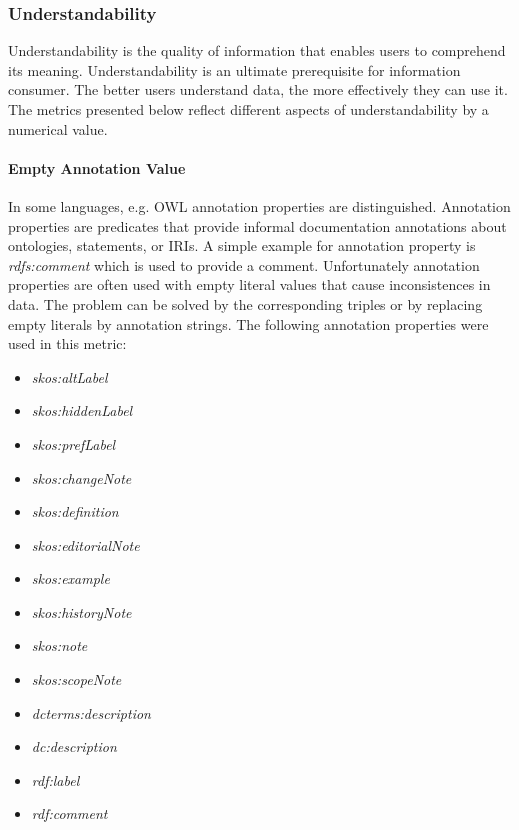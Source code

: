 
\subsubsection{Understandability}

Understandability is the quality of information that enables users to comprehend its meaning. 
Understandability is an ultimate prerequisite for information consumer. 
The better users understand data, the more effectively they can use it. 
The metrics presented below reflect different aspects of understandability by a numerical value.

\paragraph{Empty Annotation Value}
\label{par:emptyAnnotation}
In some languages, e.g. OWL annotation properties are distinguished.
Annotation properties are predicates that provide informal documentation annotations about ontologies, statements, or IRIs. 
A simple example for annotation property is \textit{rdfs:comment} which is used to provide a comment. 
Unfortunately annotation properties are often used with empty literal values that cause inconsistences in data.
The problem can be solved by the corresponding triples or by replacing empty literals by annotation strings.
The following annotation properties were used in this metric:
\begin{itemize}
\item \textit{skos:altLabel}
\item \textit{skos:hiddenLabel}
\item \textit{skos:prefLabel}
\item \textit{skos:changeNote}
\item \textit{skos:definition}
\item \textit{skos:editorialNote}
\item \textit{skos:example}
\item \textit{skos:historyNote}
\item \textit{skos:note}
\item \textit{skos:scopeNote}
\item \textit{dcterms:description}
\item \textit{dc:description}
\item \textit{rdf:label}
\item \textit{rdf:comment}
\end{itemize}


